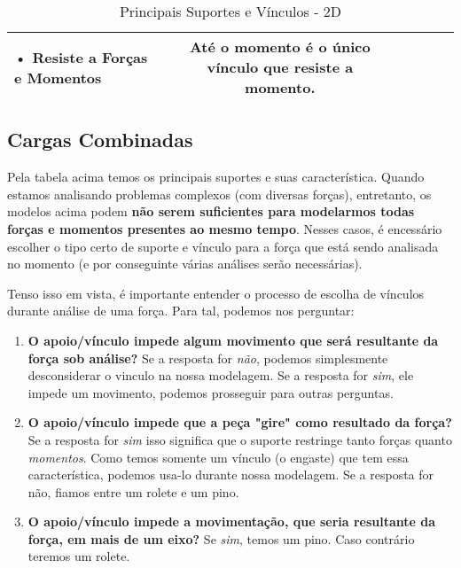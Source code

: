 \documentclass{article}
\begin{document}
\begin{table}[h]
\begin{tabular}{|l|c|c|c|l|l|}
                            \begin{minipage}{.1\columnwidth}
                                \tiny
                                • Resiste a \textbf{Forças} e \textbf{Momentos}
                            \end{minipage}&

                            \begin{minipage}{.1\columnwidth}
                                \vspace{5px}
                                \tiny
                                Até o momento é o único vínculo que resiste a momento.
                                \vspace{5px}
                            \end{minipage} \\ \hline

                \end{tabular}
                \caption{Principais Suportes e Vínculos - 2D}
            \end{table}

        \subsection{Cargas Combinadas}

            Pela tabela acima temos os principais suportes e suas característica. Quando estamos analisando problemas complexos (com diversas forças), entretanto, os modelos acima podem
            \textbf{não serem suficientes para modelarmos todas forças e momentos presentes ao mesmo tempo}. Nesses casos, é encessário escolher o tipo certo de suporte e vínculo para a força que está sendo
            analisada no momento (e por conseguinte várias análises serão necessárias).

            Tenso isso em vista, é importante entender o processo de escolha de vínculos durante análise de uma força. Para tal, podemos nos perguntar:
            \begin{enumerate}
                \item \textbf{O apoio/vínculo impede algum movimento que será resultante da força sob análise?} Se a resposta for \emph{não}, podemos simplesmente desconsiderar o vinculo na nossa
                modelagem. Se a resposta for \emph{sim}, ele impede um movimento, podemos prosseguir para outras perguntas.
                \item \textbf{O apoio/vínculo impede que a peça "gire" como resultado da força?} Se a resposta for \emph{sim} isso significa que o suporte restringe tanto forças quanto
                \emph{momentos}. Como temos somente um vínculo (o engaste) que tem essa característica, podemos usa-lo durante nossa modelagem. Se a resposta for não, fiamos entre um rolete e um pino.
                \item \textbf{O apoio/vínculo impede a movimentação, que seria resultante da força, em mais de um eixo?} Se \emph{sim}, temos um pino. Caso contrário teremos um rolete.
            \end{enumerate}
\end{document}
